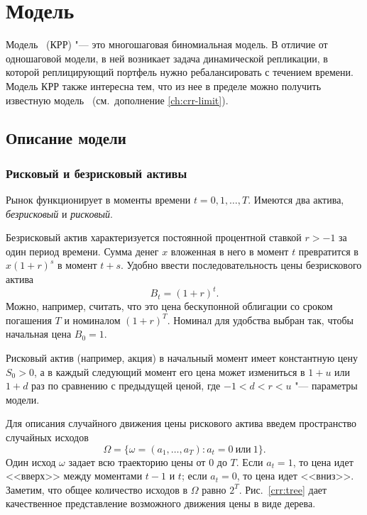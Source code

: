 \chapter{Модель \crr}
\label{ch:crr}
\chaptertoc

Модель \crr\ (КРР) "--- это многошаговая биномиальная модель.
В отличие от одношаговой модели, в ней возникает задача динамической репликации, в которой реплицирующий портфель нужно ребалансировать с течением времени.
Модель КРР также интересна тем, что из нее в пределе можно получить известную модель \bs\ (см.\ дополнение \ref{ch:crr-limit}).

\section{Описание модели}
\subsection{Рисковый и безрисковый активы}

Рынок функционирует в моменты времени $t=0,1,\dots,T$.
Имеются два актива, \emph{безрисковый} и \emph{рисковый}. 

Безрисковый актив характеризуется постоянной процентной ставкой $r>-1$ за один период времени.
Сумма денег $x$ вложенная в него в момент $t$ превратится в $x(1+r)^s$ в момент $t+s$.
Удобно ввести последовательность цены безрискового актива 
\[
B_t = (1+r)^t.
\]
Можно, например, считать, что это цена бескупонной облигации со сроком погашения $T$ и номиналом $(1+r)^T$.
Номинал для удобства выбран так, чтобы начальная цена $B_0=1$.

Рисковый актив (например, акция) в начальный момент имеет константную цену $S_0>0$, а в каждый следующий момент его цена может измениться в $1+u$ или $1+d$ раз по сравнению с предыдущей ценой, где $-1<d<r<u$ "--- параметры модели.

Для описания случайного движения цены рискового актива введем пространство случайных исходов
\[
\Omega = \{\omega = (a_1,\dots,a_T) : a_t = 0\ \text{или}\ 1\}.
\]
Один исход $\omega$ задает всю траекторию цены от 0 до $T$. Если $a_t=1$, то цена идет <<вверх>> между моментами $t-1$ и $t$; если $a_t=0$, то цена идет <<вниз>>.
Заметим, что общее количество исходов в $\Omega$ равно $2^T$.
Рис.~\ref{crr:tree} дает качественное представление возможного движения цены в виде дерева.

